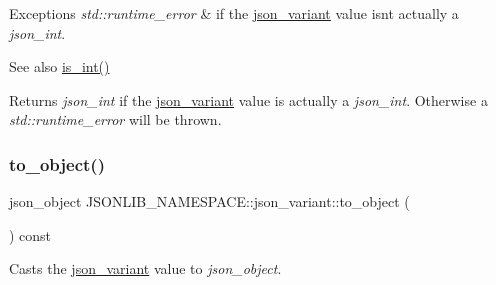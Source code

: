 \begin{DoxyExceptions}{Exceptions}
{\em std\+::runtime\+\_\+error} & if the \hyperlink{classJSONLIB__NAMESPACE_1_1json__variant}{json\+\_\+variant} value isn\textquotesingle{}t actually a {\itshape json\+\_\+int}. \\
\hline
\end{DoxyExceptions}
\begin{DoxySeeAlso}{See also}
\hyperlink{classJSONLIB__NAMESPACE_1_1json__variant_a2d6f7d2f92f5c3bfaf9c548a783a97fb}{is\+\_\+int()} 
\end{DoxySeeAlso}
\begin{DoxyReturn}{Returns}
{\itshape json\+\_\+int} if the \hyperlink{classJSONLIB__NAMESPACE_1_1json__variant}{json\+\_\+variant} value is actually a {\itshape json\+\_\+int}. Otherwise a {\itshape std\+::runtime\+\_\+error} will be thrown. 
\end{DoxyReturn}
\mbox{\label{classJSONLIB__NAMESPACE_1_1json__variant_a28035668bca7e7829340fe994581564d}} 
\subsubsection{\texorpdfstring{to\+\_\+object()}{to\_object()}\hspace{0.1cm}{\footnotesize\ttfamily [1/4]}}
{\footnotesize\ttfamily json\+\_\+object J\+S\+O\+N\+L\+I\+B\+\_\+\+N\+A\+M\+E\+S\+P\+A\+C\+E\+::json\+\_\+variant\+::to\+\_\+object (\begin{DoxyParamCaption}{ }\end{DoxyParamCaption}) const}



Casts the \hyperlink{classJSONLIB__NAMESPACE_1_1json__variant}{json\+\_\+variant} value to {\itshape json\+\_\+object}. 


